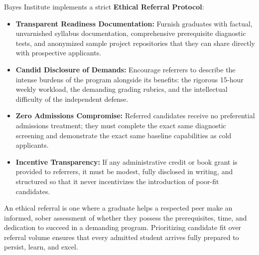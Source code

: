 Bayes Institute implements a strict \textbf{Ethical Referral Protocol}:
\begin{itemize}[leftmargin=*]
\item \textbf{Transparent Readiness Documentation:} Furnish graduates with factual, unvarnished syllabus documentation, comprehensive prerequisite diagnostic tests, and anonymized sample project repositories that they can share directly with prospective applicants.
\item \textbf{Candid Disclosure of Demands:} Encourage referrers to describe the intense burdens of the program alongside its benefits: the rigorous 15-hour weekly workload, the demanding grading rubrics, and the intellectual difficulty of the independent defense.
\item \textbf{Zero Admissions Compromise:} Referred candidates receive no preferential admissions treatment; they must complete the exact same diagnostic screening and demonstrate the exact same baseline capabilities as cold applicants.
\item \textbf{Incentive Transparency:} If any administrative credit or book grant is provided to referrers, it must be modest, fully disclosed in writing, and structured so that it never incentivizes the introduction of poor-fit candidates.
\end{itemize}

An ethical referral is one where a graduate helps a respected peer make an informed, sober assessment of whether they possess the prerequisites, time, and dedication to succeed in a demanding program. Prioritizing candidate fit over referral volume ensures that every admitted student arrives fully prepared to persist, learn, and excel.
